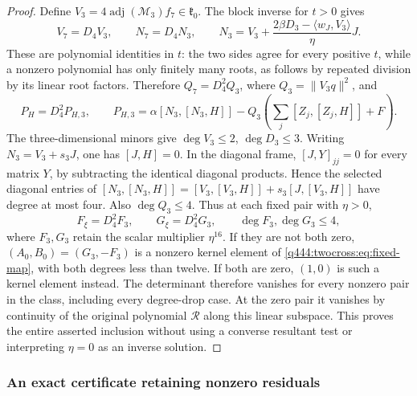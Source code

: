 \begin{proof}
Define $V_3=4\operatorname{adj}(\mathscr M_3)f_7\in\mathfrak k_0$.
The block inverse for $t>0$ gives
\[
V_7=D_4V_3,\qquad
N_7=D_4N_3,\qquad
N_3=V_3+\frac{2\beta D_3-\langle w_J,V_3\rangle}\eta J.
\]
These are polynomial identities in $t$: the two sides agree for every
positive $t$, while a nonzero polynomial has only finitely many roots,
as follows by repeated division by its linear root factors.
Therefore $Q_7=D_4^2Q_3$, where $Q_3=\|V_3q\|^2$, and
\begin{equation}
P_H=D_4^2P_{H,3},\qquad
P_{H,3}=\alpha[N_3,[N_3,H]]
-Q_3\left(\sum_j[Z_j,[Z_j,H]]+F\right).
\label{q444:twocross:eq:factor}
\end{equation}
The three-dimensional minors give $\deg V_3\le2$, $\deg D_3\le3$.
Writing $N_3=V_3+s_3J$, one has $[J,H]=0$. In the diagonal frame,
$[J,Y]_{jj}=0$ for every matrix $Y$, by subtracting the identical
diagonal products. Hence the selected diagonal entries of
$[N_3,[N_3,H]]=[V_3,[V_3,H]]+s_3[J,[V_3,H]]$ have degree at most four.
Also $\deg Q_3\le4$. Thus at each fixed pair with $\eta>0$,
\[
F_\xi=D_4^2F_3,\qquad G_\xi=D_4^2G_3,\qquad
\deg F_3,\deg G_3\le4,
\]
where $F_3,G_3$ retain the scalar multiplier $\eta^{16}$.
If they are not both zero, $(A_0,B_0)=(G_3,-F_3)$ is a nonzero
kernel element of \eqref{q444:twocross:eq:fixed-map}, with both degrees less than
twelve. If both are zero, $(1,0)$ is such a kernel element instead.
The determinant therefore vanishes for every nonzero pair in the class,
including every degree-drop case. At the zero pair it vanishes by
continuity of the original polynomial $\mathscr R$ along this linear
subspace. This proves the entire asserted inclusion without using a
converse resultant test or interpreting $\eta=0$ as an inverse solution.
\end{proof}

\subsubsection{An exact certificate retaining nonzero residuals}
\label{q444:twocross:quantitative-section}


